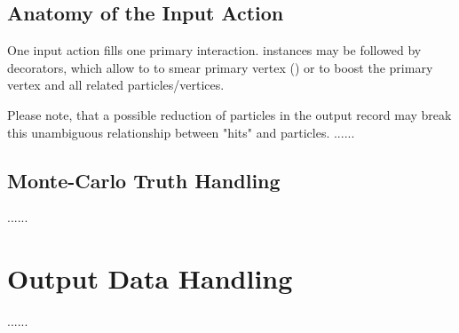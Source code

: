 \subsection{Anatomy of the Input Action}
\label{sec:ddg4-implementation-geant4inputaction}
\noindent
One input action fills one primary interaction.
 instances may be followed by decorators, which 
allow to to smear primary vertex () or
to boost the primary vertex  and all 
related particles/vertices.


Please note, that a possible reduction of particles in
the output record may break this unambiguous relationship between 
"hits" and particles.
......

\subsection{Monte-Carlo Truth Handling}
\label{sec:ddg4-implementation-particle-handling}
......
\newpage

\section{Output Data Handling}
\label{sec:ddg4-implementation-output-handling}
......
\newpage
